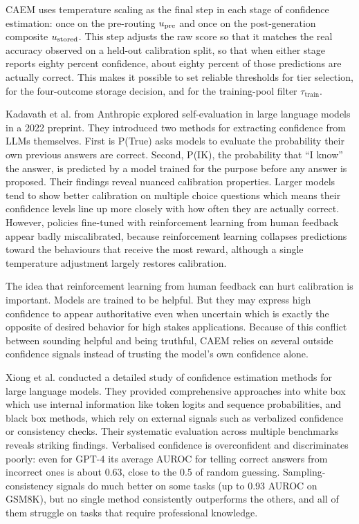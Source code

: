 CAEM uses temperature scaling as the final step in each stage of confidence estimation: once on the pre-routing $u_{\text{pre}}$ and once on the post-generation composite $u_{\text{stored}}$. This step adjusts the raw score so that it matches the real accuracy observed on a held-out calibration split, so that when either stage reports eighty percent confidence, about eighty percent of those predictions are actually correct. This makes it possible to set reliable thresholds for tier selection, for the four-outcome storage decision, and for the training-pool filter $\tau_{\text{train}}$.

Kadavath et al. \cite{kadavath2022language} from Anthropic explored self-evaluation in large language models in a 2022 preprint. They introduced two methods for extracting confidence from LLMs themselves. First is P(True) asks models to evaluate the probability their own previous answers are correct. Second, P(IK), the probability that ``I know'' the answer, is predicted by a model trained for the purpose before any answer is proposed. Their findings reveal nuanced calibration properties. Larger models tend to show better calibration on multiple choice questions which means their confidence levels line up more closely with how often they are actually correct. However, policies fine-tuned with reinforcement learning from human feedback appear badly miscalibrated, because reinforcement learning collapses predictions toward the behaviours that receive the most reward, although a single temperature adjustment largely restores calibration.

The idea that reinforcement learning from human feedback can hurt calibration is important. Models are trained to be helpful. But they may express high confidence to appear authoritative even when uncertain which is exactly the opposite of desired behavior for high stakes applications. Because of this conflict between sounding helpful and being truthful, CAEM relies on several outside confidence signals instead of trusting the model's own confidence alone.

Xiong et al. \cite{xiong2023can} conducted a detailed study of confidence estimation methods for large language models. They provided comprehensive approaches into white box which use internal information like token logits and sequence probabilities, and black box methods, which rely on external signals such as verbalized confidence or consistency checks. Their systematic evaluation across multiple benchmarks reveals striking findings. Verbalised confidence is overconfident and discriminates poorly: even for GPT-4 its average AUROC for telling correct answers from incorrect ones is about 0.63, close to the 0.5 of random guessing. Sampling-consistency signals do much better on some tasks (up to 0.93 AUROC on GSM8K), but no single method consistently outperforms the others, and all of them struggle on tasks that require professional knowledge.


